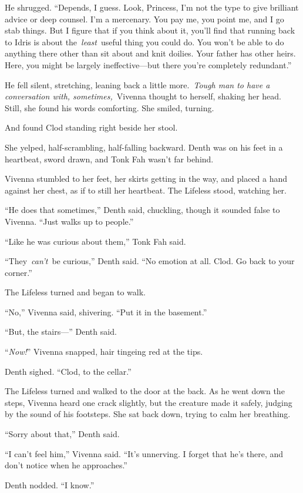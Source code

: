 He shrugged. “Depends, I guess. Look, Princess, I’m not the type to give brilliant advice or deep counsel. I’m a mercenary. You pay me, you point me, and I go stab things. But I figure that if you think about it, you’ll find that running back to Idris is about the~\textit{least}~useful thing you could do. You won’t be able to do anything there other than sit about and knit doilies. Your father has other heirs. Here, you might be largely ineffective—but there you’re completely redundant.”

He fell silent, stretching, leaning back a little more.~\textit{Tough man to have a conversation with, sometimes,}~Vivenna thought to herself, shaking her head. Still, she found his words comforting. She smiled, turning.

And found Clod standing right beside her stool.

She yelped, half-scrambling, half-falling backward. Denth was on his feet in a heartbeat, sword drawn, and Tonk Fah wasn’t far behind.

Vivenna stumbled to her feet, her skirts getting in the way, and placed a hand against her chest, as if to still her heartbeat. The Lifeless stood, watching her.

“He does that sometimes,” Denth said, chuckling, though it sounded false to Vivenna. “Just walks up to people.”

“Like he was curious about them,” Tonk Fah said.

“They~\textit{can’t}~be curious,” Denth said. “No emotion at all. Clod. Go back to your corner.”

The Lifeless turned and began to walk.

“No,” Vivenna said, shivering. “Put it in the basement.”

“But, the stairs—” Denth said.

“\textit{Now!}” Vivenna snapped, hair tingeing red at the tips.

Denth sighed. “Clod, to the cellar.”

The Lifeless turned and walked to the door at the back. As he went down the steps, Vivenna heard one crack slightly, but the creature made it safely, judging by the sound of his footsteps. She sat back down, trying to calm her breathing.

“Sorry about that,” Denth said.

“I can’t feel him,” Vivenna said. “It’s unnerving. I forget that he’s there, and don’t notice when he approaches.”

Denth nodded. “I know.”

